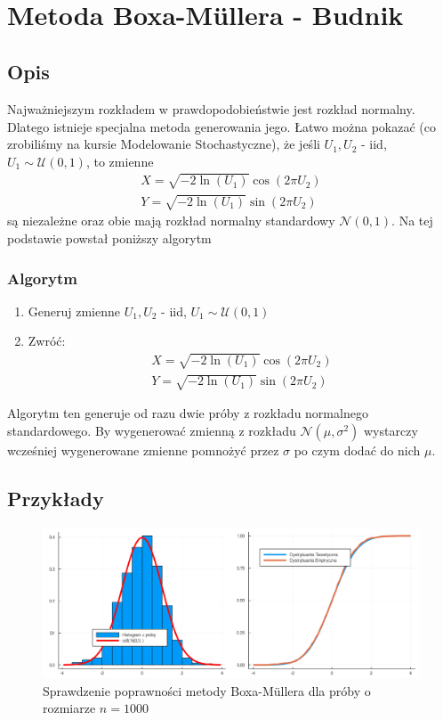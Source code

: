 \documentclass[12pt]{mwrep}
\begin{document}
	\section{Metoda Boxa-M{\"u}llera\textsuperscript{\cite{box-kox}} - Budnik}
	\subsection{Opis}
	Najważniejszym rozkładem w prawdopodobieństwie jest rozkład normalny. Dlatego istnieje specjalna metoda generowania jego. Łatwo można pokazać (co zrobiliśmy na kursie Modelowanie Stochastyczne), że jeśli $U_1,U_2$ - iid, $U_1\sim\mathcal{U}(0,1)$, to zmienne
	\begin{equation}\label{eq:B-M}
		\begin{split}
			X=\sqrt{-2\ln(U_1)}\cos(2\pi U_2)\\
			Y=\sqrt{-2\ln(U_1)}\sin(2\pi U_2)
		\end{split}
	\end{equation}
	są niezależne oraz obie mają rozkład normalny standardowy $\mathcal{N}(0,1)$. Na tej podstawie powstał poniższy algorytm
	\subsubsection{Algorytm}
	\begin{enumerate}[leftmargin=10mm]
		\item Generuj zmienne $U_1, U_2$ - iid, $U_1\sim\mathcal{U}(0,1)$
		\item Zwróć:
		\begin{equation}
			\begin{split}
				X=\sqrt{-2\ln(U_1)}\cos\left(2\pi U_2\right)\\
				Y=\sqrt{-2\ln(U_1)}\sin\left(2\pi U_2\right)
			\end{split}
		\end{equation}
	\end{enumerate}
	Algorytm ten generuje od razu dwie próby z rozkładu normalnego standardowego. By wygenerować zmienną z rozkładu $\mathcal{N}(\mu,\sigma^2)$ wystarczy wcześniej wygenerowane zmienne pomnożyć przez $\sigma$ po czym dodać do nich $\mu$.
	\subsection{Przykłady}
	
	\begin{figure}[H]\caption{Sprawdzenie poprawności metody Boxa-M\"ullera dla próby o rozmiarze $n=1000$}\label{fig:BM}
		\includegraphics[width=\columnwidth]{fig/fig_BM.png}
	\end{figure}
	
\end{document}
